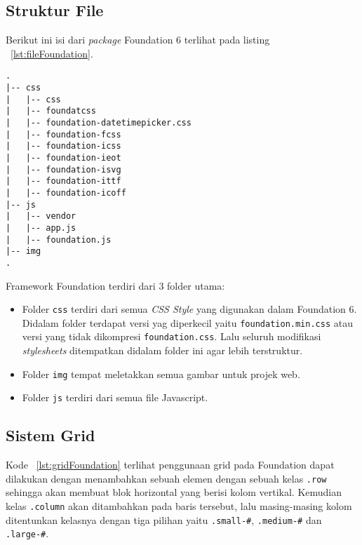 \subsection{Struktur File}
Berikut ini isi dari \textit{package} Foundation 6 terlihat pada listing ~\ref{lst:fileFoundation}.
\begin{lstlisting}[basicstyle=\ttfamily, frame=single, columns=fullflexible, keepspaces=true, breaklines=true, showstringspaces=false, label={lst:fileFoundation}, caption=Struktur File Foundation.]
.
|-- css
|   |-- css 
|   |-- foundatcss 
|   |-- foundation-datetimepicker.css 
|   |-- foundation-fcss 
|   |-- foundation-icss 
|   |-- foundation-ieot 
|   |-- foundation-isvg 
|   |-- foundation-ittf 
|   |-- foundation-icoff 
|-- js
|   |-- vendor 
|   |-- app.js 
|   |-- foundation.js 
|-- img
.
\end{lstlisting}

Framework Foundation terdiri dari 3 folder utama:
\begin{itemize}
	\item Folder \texttt{css} terdiri dari semua \textit{CSS Style} yang digunakan dalam Foundation 6. Didalam folder terdapat versi yag diperkecil yaitu \verb|foundation.min.css| atau versi yang tidak dikompresi \verb|foundation.css|. Lalu seluruh modifikasi \textit{stylesheets} ditempatkan didalam folder ini agar lebih terstruktur.
	\item Folder \texttt{img} tempat meletakkan semua gambar untuk projek web.
	\item Folder \texttt{js} terdiri dari semua file Javascript.
\end{itemize} 
\cite{zurbfoundation:17}

\subsection{Sistem Grid}
Kode ~\ref{lst:gridFoundation} terlihat penggunaan grid pada Foundation dapat dilakukan dengan menambahkan sebuah elemen dengan sebuah kelas \texttt{.row} sehingga akan membuat blok horizontal yang berisi kolom vertikal. Kemudian kelas \texttt{.column} akan ditambahkan pada baris tersebut, lalu masing-masing kolom ditentunkan kelasnya dengan tiga pilihan yaitu 
\texttt{.small-\#}, \texttt{.medium-\#} dan \texttt{.large-\#}.

